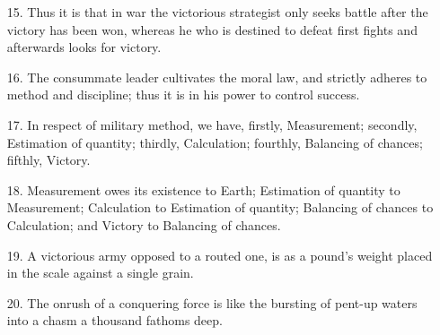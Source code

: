 \documentclass[11pt,openany]{memoir}
\newcommand{\enumeratemargin}{1.30em}
\begin{document}
\begin{enumerate}[leftmargin=\enumeratemargin]
\item[15.] Thus it is that in war the victorious strategist only seeks battle after the victory has been won, whereas he who is destined to defeat first fights and afterwards looks for victory.
\item[16.] The consummate leader cultivates the moral law, and strictly adheres to method and discipline; thus it is in his power to control success.
\item[17.] In respect of military method, we have, firstly, Measurement; secondly, Estimation of quantity; thirdly, Calculation; fourthly, Balancing of chances; fifthly, Victory.
\item[18.] Measurement owes its existence to Earth; Estimation of quantity to Measurement; Calculation to Estimation of quantity; Balancing of chances to Calculation; and Victory to Balancing of chances.
\item[19.] A victorious army opposed to a routed one, is as a pound's weight placed in the scale against a single grain.
\item[20.] The onrush of a conquering force is like the bursting of pent-up waters into a chasm a thousand fathoms deep.
\end{enumerate}
\end{document}
